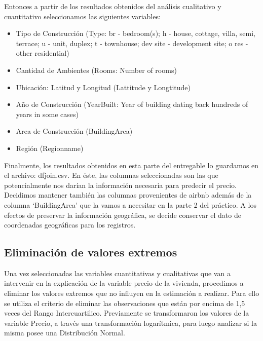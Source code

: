 

Entonces a partir de los resultados obtenidos del análisis cualitativo y cuantitativo seleccionamos las siguientes variables:

\begin{itemize}
\item Tipo de Construcción (Type: br - bedroom(s); h - house, cottage, villa, semi, terrace; u - unit, duplex; t - townhouse; dev site - development site; o res - other residential)
\item Cantidad de Ambientes (Rooms: Number of rooms)
\item Ubicación: Latitud y Longitud (Lattitude y Longtitude) 
\item Año de Construcción (YearBuilt: Year of building dating back hundreds of years in some cases)
\item Area de Construcción (BuildingArea)
\item Región (Regionname)
\end{itemize}




Finalmente, los resultados obtenidos en esta parte del entregable lo guardamos en el archivo: dfjoin.csv. En éste, las columnas seleccionadas son las que potencialmente nos darían la información necesaria para predecir el precio. Decidimos mantener también las columnas provenientes de airbnb además de la columna `BuildingArea' que la vamos a necesitar en la parte 2 del práctico. A los efectos de preservar la información geográfica, se decide conservar el dato de coordenadas geográficas para los registros.





\subsection*{Eliminación de valores extremos }

Una vez seleccionadas las variables cuantitativas y cualitativas que van a intervenir en la explicación de la variable precio de la vivienda, procedimos a eliminar los valores extremos que no influyen en la estimación a realizar.
Para ello se utiliza el criterio de eliminar las observaciones que están por encima de 1,5 veces del Rango Intercuartilico.
Previamente se transformaron los valores de la variable Precio, a través una transformación logarítmica, para luego analizar si la misma posee una Distribución Normal.

